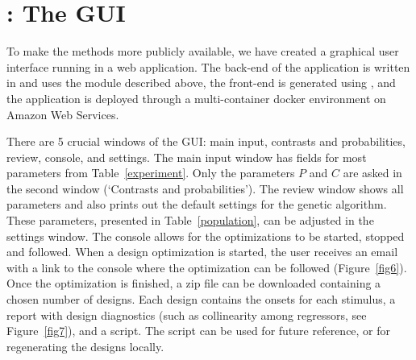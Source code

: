 \documentclass[article]{jss}
\begin{document}
\section[neurodesign: The GUI]{: The GUI}\label{sec:pkgneurodesign:-gui}

To make the methods more publicly available, we have created a
graphical user interface running in a web application.  The back-end
of the application is written in  and uses the
 module  described above, the
front-end is generated using  \citep{django}, and the
application is deployed through a multi-container docker environment
on Amazon Web Services.

There are 5 crucial windows of the GUI: main input, contrasts and
probabilities, review, console, and settings.  The main input window
has fields for most parameters from Table~\ref{experiment}.  Only the
parameters $P$ and $C$ are asked in the second window (`Contrasts and
probabilities').  The review window shows all parameters and also
prints out the default settings for the genetic algorithm.  These
parameters, presented in Table~\ref{population}, can be adjusted in
the settings window.  The console allows for the optimizations to be
started, stopped and followed.  When a design optimization is started,
the user receives an email with a link to the console where the
optimization can be followed (Figure~\ref{fig6}). Once the
optimization is finished, a zip file can be downloaded containing a
chosen number of designs.  Each design contains the onsets for each
stimulus, a report with design diagnostics (such as collinearity among
regressors, see Figure~\ref{fig7}), and a script.  The script can be
used for future reference, or for regenerating the designs locally.
%
\end{document}
